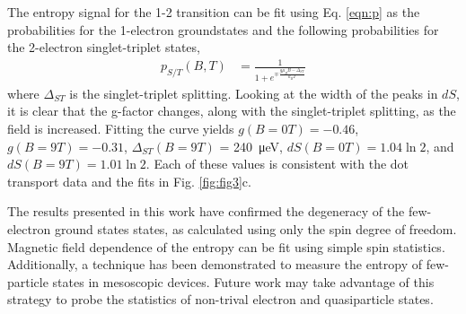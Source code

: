 \documentclass[twocolumn,showpacs,preprintnumbers,amsmath,amssymb,pra,aps,superscriptaddress]{revtex4-1}
\begin{document}
The entropy signal for the 1-2 transition can be fit using Eq. \ref{eqn:p} as the probabilities for the 1-electron groundstates and the following probabilities for the 2-electron singlet-triplet states,
%
\begin{align}
\label{eqn:pst}
        p_{S/T}(B, T) &= \frac{1}{1+ e^{\mp \frac{g\mu_B B - \Delta_{ST}}{k_B T}}}
\end{align}
%
where $\Delta_{ST}$ is the singlet-triplet splitting. Looking at the width of the peaks in $dS$, it is clear that the g-factor changes, along with the singlet-triplet splitting, as the field is increased. Fitting the curve yields $g(B{=}0T)=-0.46$, $g(B{=}9T)=-0.31$, $\Delta_{ST}(B{=}9T)$ = \SI{240}{\micro\electronvolt}, $dS(B{=}0T) = 1.04\ln{2}$, and $dS(B{=}9T) = 1.01\ln{2}$. Each of these values is consistent with the dot transport data and the fits in Fig. \ref{fig:fig3}c.

The results presented in this work have confirmed the degeneracy of the few-electron ground states states, as calculated using only the spin degree of freedom. Magnetic field dependence of the entropy can be fit using simple spin statistics.  Additionally, a technique has been demonstrated to measure the entropy of few-particle states in mesoscopic devices. Future work may take advantage of this strategy to probe the statistics of non-trival electron and quasiparticle states.


{}

\end{document}
